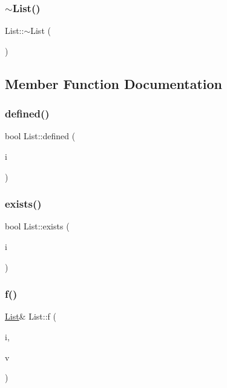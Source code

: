 \mbox{\label{classList_a70aecf37bd9d779a394e4d50377fbf5f}} 
\subsubsection{\texorpdfstring{$\sim$\+List()}{~List()}}
{\footnotesize\ttfamily List\+::$\sim$\+List (\begin{DoxyParamCaption}{ }\end{DoxyParamCaption})}



\subsection{Member Function Documentation}
\mbox{\label{classList_af3048d8d98d9a42aff144776735848a9}} 
\subsubsection{\texorpdfstring{defined()}{defined()}}
{\footnotesize\ttfamily bool List\+::defined (\begin{DoxyParamCaption}\item[{int}]{i }\end{DoxyParamCaption})}

\mbox{\label{classList_aaf10ec6ce3eaf345c726ca21c54bbe74}} 
\subsubsection{\texorpdfstring{exists()}{exists()}}
{\footnotesize\ttfamily bool List\+::exists (\begin{DoxyParamCaption}\item[{int}]{i }\end{DoxyParamCaption})}

\mbox{\label{classList_adb526b9d6b74b47c3f49d34aff737753}} 
\subsubsection{\texorpdfstring{f()}{f()}\hspace{0.1cm}{\footnotesize\ttfamily [1/2]}}
{\footnotesize\ttfamily \mbox{\hyperlink{classList}{List}}\& List\+::f (\begin{DoxyParamCaption}\item[{int}]{i,  }\item[{\mbox{\hyperlink{Node_8h_aa7fdace1cf021510d341a4ce92e2223a}{n\+Flt}}}]{v }\end{DoxyParamCaption})}

